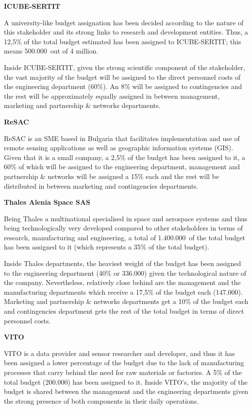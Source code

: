 \textbf{ICUBE-SERTIT}

A university-like budget assignation has been decided according to the nature of this stakeholder and its strong links to research and development entities. Thus, a 12,5\% of the total budget estimated has been assigned to ICUBE-SERTIT; this means 500.000\EUR \ out of 4 million.

Inside ICUBE-SERTIT, given the strong scientific component of the stakeholder, the vast majority of the budget will be assigned to the direct personnel costs of the engineering department (60\%). An 8\% will be assigned to contingencies and the rest will be approximately equally assigned in between management, marketing and partnership \& networks departments. 

\textbf{ReSAC}

ReSAC is an SME based in Bulgaria that facilitates implementation and use of remote sensing applications as well as geographic information systems (GIS). Given that it is a small company, a 2,5\% of the budget has been assigned to it, a 60\% of which will be assigned to the engineering department, management and partnership \& networks will be assigned a 15\% each and the rest will be distributed in between marketing and contingencies departments. 

\textbf{Thales Alenia Space SAS}

Being Thales a multinational specialised in space and aerospace systems and thus being technologically very developed compared to other stakeholders in terms of research, manufacturing and engineering, a total of 1.400.000\EUR \ of the total budget has been assigned to it (which represents a 35\% of the total budget). 

Inside Thales departments, the heaviest weight of the budget has been assigned to the engineering department (40\% or 336.000\EUR) given the technological nature of the company. Nevertheless, relatively close behind are the management and the manufacturing departments which receive a 17,5\% of the budget each (147.000\EUR). Marketing and partnership \& networks departments get a 10\% of the budget each and contingencies department gets the rest of the total budget in terms of direct personnel costs.
 
\textbf{VITO}

VITO is a data provider and sensor researcher and developer, and thus it has been assigned a lower percentage of the budget due to the lack of manufacturing processes that carry behind the need for raw materials or factories. A 5\% of the total budget (200.000\EUR) has been assigned to it. Inside VITO’s, the majority of the budget is shared between the management and the engineering departments given the strong presence of both components in their daily operations.

